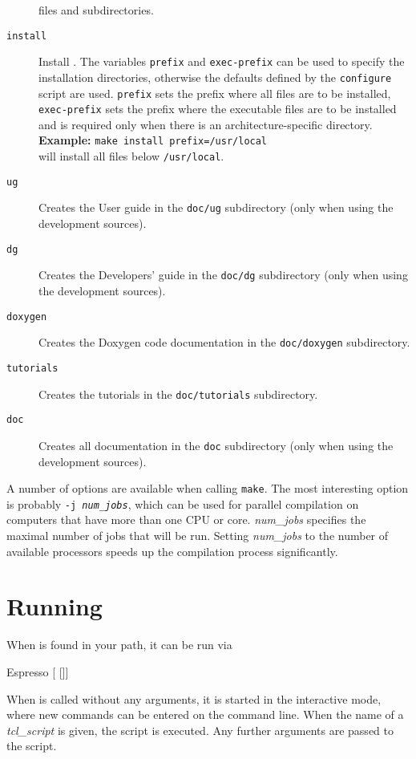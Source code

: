 \begin{description}
  files and subdirectories.
\item[\texttt{install}] Install \es. The variables \texttt{prefix} and
  \texttt{exec-prefix} can be used to specify the installation
  directories, otherwise the defaults defined by the
  \texttt{configure} script are used. \texttt{prefix} sets the prefix
  where all \es files are to be installed, \texttt{exec-prefix} sets
  the prefix where the executable files are to be installed and is
  required only when there is an architecture-specific directory.\\
  \textbf{Example:} \verb!make install prefix=/usr/local!\\
  will install all files below \texttt{/usr/local}.
\item[\texttt{ug\ \ }] Creates the User guide in the \texttt{doc/ug}
  subdirectory (only when using the development sources).
\item[\texttt{dg\ \ }] Creates the Developers' guide in the
  \texttt{doc/dg} subdirectory (only when using the development
  sources).
\item[\texttt{doxygen\ \ }] Creates the Doxygen code documentation in the
  \texttt{doc/doxygen} subdirectory.
\item[\texttt{tutorials\ \ }] Creates the \es tutorials in the
  \texttt{doc/tutorials} subdirectory.
\item[\texttt{doc\ }] Creates all documentation in the \texttt{doc}
  subdirectory (only when using the development sources).
\end{description}

A number of options are available when calling \texttt{make}.  The
most interesting option is probably \texttt{-j \textit{num\_jobs}},
which can be used for parallel compilation on computers that have more
than one CPU or core.  \textit{num\_jobs} specifies the maximal number
of jobs that will be run.  Setting \textit{num\_jobs} to the number of
available processors speeds up the compilation process significantly.

\section{Running \es}
\label{sec:run}

When \es is found in your path, it can be run via
\begin{code}
Espresso [ []]
\end{code}

 When \es{} is called without any arguments,
it is started in the interactive mode, where new commands can be
entered on the command line. When the name of a \textit{tcl\_script}
is given, the script is executed. Any further arguments are passed to
the script.

